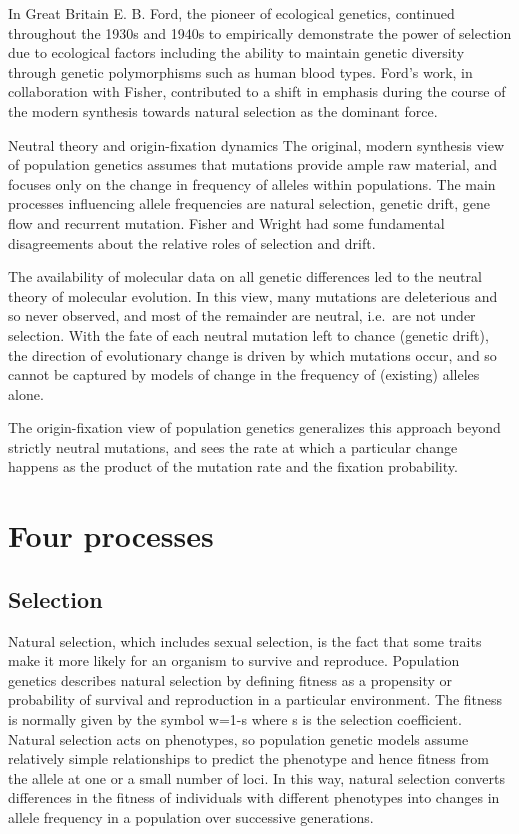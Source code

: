 In Great Britain E. B. Ford, the pioneer of ecological genetics, continued throughout the 1930s and 1940s to empirically demonstrate the power of selection due to ecological factors including the ability to maintain genetic diversity through genetic polymorphisms such as human blood types. Ford's work, in collaboration with Fisher, contributed to a shift in emphasis during the course of the modern synthesis towards natural selection as the dominant force.

Neutral theory and origin-fixation dynamics
The original, modern synthesis view of population genetics assumes that mutations provide ample raw material, and focuses only on the change in frequency of alleles within populations. The main processes influencing allele frequencies are natural selection, genetic drift, gene flow and recurrent mutation. Fisher and Wright had some fundamental disagreements about the relative roles of selection and drift.

The availability of molecular data on all genetic differences led to the neutral theory of molecular evolution. In this view, many mutations are deleterious and so never observed, and most of the remainder are neutral, i.e.~are not under selection. With the fate of each neutral mutation left to chance (genetic drift), the direction of evolutionary change is driven by which mutations occur, and so cannot be captured by models of change in the frequency of (existing) alleles alone.

The origin-fixation view of population genetics generalizes this approach beyond strictly neutral mutations, and sees the rate at which a particular change happens as the product of the mutation rate and the fixation probability.

\hypertarget{four-processes}{%
\section{Four processes}\label{four-processes}}

\hypertarget{selection}{%
\subsection{Selection}\label{selection}}

Natural selection, which includes sexual selection, is the fact that some traits make it more likely for an organism to survive and reproduce. Population genetics describes natural selection by defining fitness as a propensity or probability of survival and reproduction in a particular environment. The fitness is normally given by the symbol w=1-s where s is the selection coefficient. Natural selection acts on phenotypes, so population genetic models assume relatively simple relationships to predict the phenotype and hence fitness from the allele at one or a small number of loci. In this way, natural selection converts differences in the fitness of individuals with different phenotypes into changes in allele frequency in a population over successive generations.

